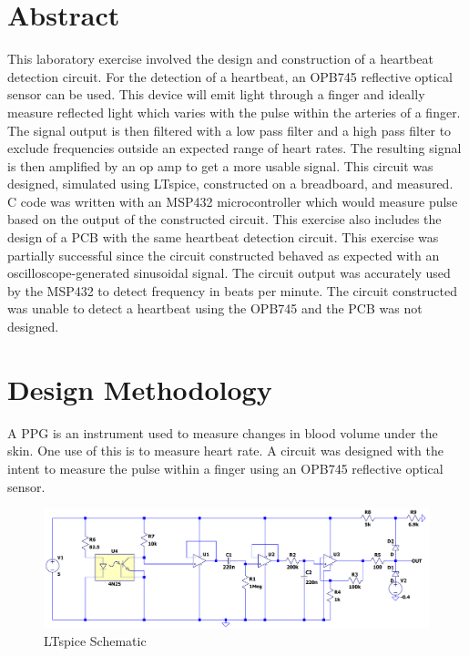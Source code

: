 \documentclass[CMPE]{KGCOEReport}
\begin{document}
\maketitle

\section*{Abstract}

This laboratory exercise involved the design and construction of a heartbeat detection circuit. For the detection of a heartbeat, an OPB745 reflective optical sensor can be used. This device will emit light through a finger and ideally measure reflected light which varies with the pulse within the arteries of a finger. The signal output is then filtered with a low pass filter and a high pass filter to exclude frequencies outside an expected range of heart rates. The resulting signal is then amplified by an op amp to get a more usable signal. This circuit was designed, simulated using LTspice, constructed on a breadboard, and measured. C code was written with an MSP432 microcontroller which would measure pulse based on the output of the constructed circuit. This exercise also includes the design of a PCB with the same heartbeat detection circuit. This exercise was partially successful since the circuit constructed behaved as expected with an oscilloscope-generated sinusoidal signal. The circuit output was accurately used by the MSP432 to detect frequency in beats per minute. The circuit constructed was unable to detect a heartbeat using the OPB745 and the PCB was not designed.

\section*{Design Methodology}

A PPG is an instrument used to measure changes in blood volume under the skin. One use of this is to measure heart rate. A circuit was designed with the intent to measure the pulse within a finger using an OPB745 reflective optical sensor.

\begin{figure}[H]
    \centering
    \includegraphics[width=1\textwidth]{LTspiceCompleteSchematic.png}
    \caption{LTspice Schematic}
    \label{fig:ltspiceCompleteSchematic}
\end{figure}
\end{document}
